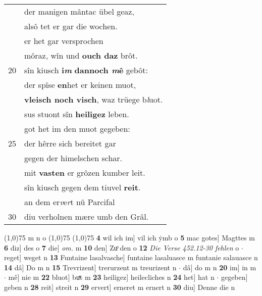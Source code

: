 \documentclass[8pt,a4paper,notitlepage]{article}
\begin{document}
\begin{table}[ht]
\begin{minipage}[t]{0.5\linewidth}
\begin{tabular}{rl}
 & der manigen mântac übel geaz,\\ 
 & alsô tet er gar die wochen.\\ 
 & er het gar versprochen\\ 
 & môraz, wîn und \textbf{ouch daz} brôt.\\ 
20 & sîn kiusch \textbf{i\textit{m}} \textbf{dannoch \textit{m}ê} gebôt:\\ 
 & der spîse \textbf{en}het er keinen muot,\\ 
 & \textbf{vleisch noch visch}, waz trüege b\textit{l}uot.\\ 
 & sus stuont sîn \textbf{heiligez} leben.\\ 
 & got het im den muot gegeben:\\ 
25 & der hêrre sich bereitet gar\\ 
 & gegen der himelschen schar.\\ 
 & mit \textbf{vasten} er grôzen kumber leit.\\ 
 & sîn kiusch gegen dem tiuvel \textbf{reit}.\\ 
 & an dem er\textit{v}e\textit{r}t nû Parcifal\\ 
30 & diu verholnen mære umb den Grâl.\\ 
\end{tabular}
\scriptsize
\line(1,0){75} \newline
m n o \newline
\line(1,0){75} \newline
\newline
\line(1,0){75} \newline
\textbf{4} wil ich im] vil ich ẏmb o \textbf{5} mac gotes] Magttes m \textbf{6} diz] des o \textbf{7} die] \textit{om.} m \textbf{10} den] Zuͦ den o \textbf{12} \textit{Die Verse 452.12-30 fehlen} o   $\cdot$ reget] weget n \textbf{13} Funtaine lasalvasche] funtaine lasaluasce m funtanie salauasce n \textbf{14} dâ] Do m n \textbf{15} Trevrizent] trerurzent m treurizent n  $\cdot$ dâ] do m n \textbf{20} im] in m  $\cdot$ mê] nie m \textbf{22} bluot] buͯt m \textbf{23} heiligez] heilecliches n \textbf{24} het] hat n  $\cdot$ gegeben] geben n \textbf{28} reit] streit n \textbf{29} ervert] erneret m ernert n \textbf{30} diu] Denne die n \newline
\end{minipage}
\end{table}
\newpage
\end{document}
